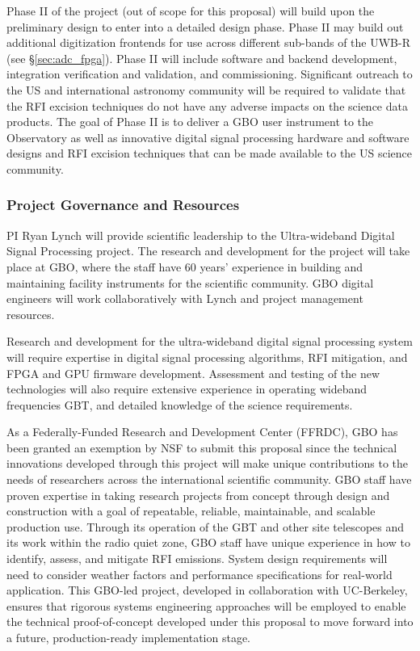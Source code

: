 \documentclass[10pt]{myNSF}
\begin{document}
Phase {\sc II} of the project (out of scope for this proposal) will
build upon the preliminary design to enter into a detailed design
phase. Phase {\sc II} may build out additional digitization frontends
for use across different sub-bands of the UWB-R (see
\S\ref{sec:adc_fpga}). Phase {\sc II} will include software and
backend development, integration verification and validation, and
commissioning. Significant outreach to the US and international
astronomy community will be required to validate that the RFI excision
techniques do not have any adverse impacts on the science data
products. The goal of Phase {\sc II} is to deliver a GBO user
instrument to the Observatory as well as innovative digital signal
processing hardware and software designs and RFI excision techniques
that can be made available to the US science community.

\subsubsection{Project Governance and Resources}
\label{sec:governance}

\label{sec:team}

PI Ryan Lynch will provide scientific leadership to the Ultra-wideband
Digital Signal Processing project. The research and development for
the project will take place at GBO, where the staff have 60 years'
experience in building and maintaining facility instruments for the
scientific community. GBO digital engineers will work collaboratively
with Lynch and project management resources.

Research and development for the ultra-wideband digital signal
processing system will require expertise in digital signal processing
algorithms, RFI mitigation, and FPGA and GPU firmware
development. Assessment and testing of the new technologies will also
require extensive experience in operating wideband frequencies GBT,
and detailed knowledge of the science requirements.

As a Federally-Funded Research and Development Center (FFRDC), GBO has
been granted an exemption by NSF to submit this proposal since the
technical innovations developed through this project will make unique
contributions to the needs of researchers across the international
scientific community. GBO staff have proven expertise in taking
research projects from concept through design and construction with a
goal of repeatable, reliable, maintainable, and scalable production
use. Through its operation of the GBT and other site telescopes and
its work within the radio quiet zone, GBO staff have unique experience
in how to identify, assess, and mitigate RFI emissions. System design
requirements will need to consider weather factors and performance
specifications for real-world application. This GBO-led project,
developed in collaboration with UC-Berkeley, ensures that rigorous
systems engineering approaches will be employed to enable the
technical proof-of-concept developed under this proposal to move
forward into a future, production-ready implementation stage.
\end{document}

